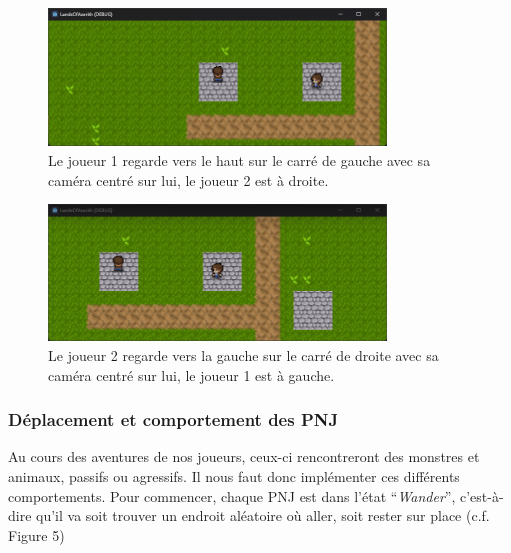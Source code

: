 \begin{figure}[H]
    \centering
    \includegraphics[width=0.8\textwidth]{2.game/assets/gameplay3.png}
    \caption{Le joueur 1 regarde vers le haut sur le carré de gauche avec sa caméra centré sur lui, le joueur 2 est à droite.}
    \label{fig:gameplay3}
\end{figure}

\begin{figure}[H]
    \centering
    \includegraphics[width=0.8\textwidth]{2.game/assets/gameplay4.png}
    \caption{Le joueur 2 regarde vers la gauche sur le carré de droite avec sa caméra centré sur lui, le joueur 1 est à gauche.}
    \label{fig:gameplay4}
\end{figure}


\subsubsection*{Déplacement et comportement des PNJ}

Au cours des aventures de nos joueurs, ceux-ci rencontreront des monstres et animaux, passifs ou agressifs.
Il nous faut donc implémenter ces différents comportements.
Pour commencer, chaque PNJ est dans l'état “\textit{Wander}”, c'est-à-dire qu'il va soit trouver un endroit aléatoire où aller, soit rester sur place (c.f. Figure 5)

